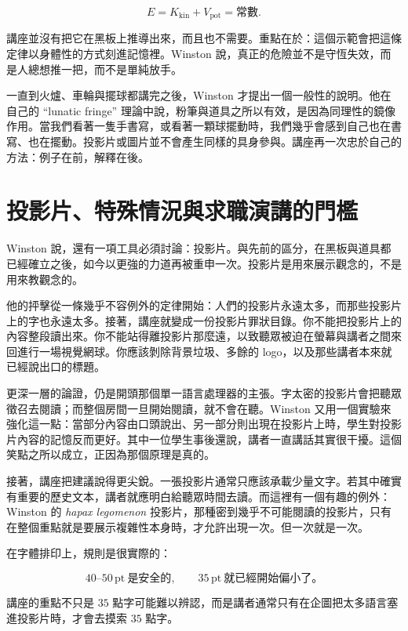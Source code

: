\begin{equation}
E = K_{\mathrm{kin}} + V_{\mathrm{pot}} = \text{常數}.
\end{equation}

講座並沒有把它在黑板上推導出來，而且也不需要。重點在於：這個示範會把這條定律以身體性的方式刻進記憶裡。Winston 說，真正的危險並不是守恆失效，而是人總想推一把，而不是單純放手。

一直到火爐、車輪與擺球都講完之後，Winston 才提出一個一般性的說明。他在自己的 ``lunatic fringe'' 理論中說，粉筆與道具之所以有效，是因為同理性的鏡像作用。當我們看著一隻手書寫，或看著一顆球擺動時，我們幾乎會感到自己也在書寫、也在擺動。投影片或圖片並不會產生同樣的具身參與。講座再一次忠於自己的方法：例子在前，解釋在後。

\section{投影片、特殊情況與求職演講的門檻}

Winston 說，還有一項工具必須討論：投影片。與先前的區分，在黑板與道具都已經確立之後，如今以更強的力道再被重申一次。投影片是用來展示觀念的，不是用來教觀念的。

他的抨擊從一條幾乎不容例外的定律開始：人們的投影片永遠太多，而那些投影片上的字也永遠太多。接著，講座就變成一份投影片罪狀目錄。你不能把投影片上的內容整段讀出來。你不能站得離投影片那麼遠，以致聽眾被迫在螢幕與講者之間來回進行一場視覺網球。你應該剝除背景垃圾、多餘的 logo，以及那些講者本來就已經說出口的標題。

更深一層的論證，仍是開頭那個單一語言處理器的主張。字太密的投影片會把聽眾徵召去閱讀；而整個房間一旦開始閱讀，就不會在聽。Winston 又用一個實驗來強化這一點：當部分內容由口頭說出、另一部分則出現在投影片上時，學生對投影片內容的記憶反而更好。其中一位學生事後還說，講者一直講話其實很干擾。這個笑點之所以成立，正因為那個原理是真的。

接著，講座把建議說得更尖銳。一張投影片通常只應該承載少量文字。若其中確實有重要的歷史文本，講者就應明白給聽眾時間去讀。而這裡有一個有趣的例外：Winston 的 \emph{hapax legomenon} 投影片，那種密到幾乎不可能閱讀的投影片，只有在整個重點就是要展示複雜性本身時，才允許出現一次。但一次就是一次。

在字體排印上，規則是很實際的：

\begin{equation}
40\text{--}50\,\mathrm{pt}\ \text{是安全的}, \qquad 35\,\mathrm{pt}\ \text{就已經開始偏小了。}
\end{equation}

講座的重點不只是 \(35\) 點字可能難以辨認，而是講者通常只有在企圖把太多語言塞進投影片時，才會去摸索 \(35\) 點字。

